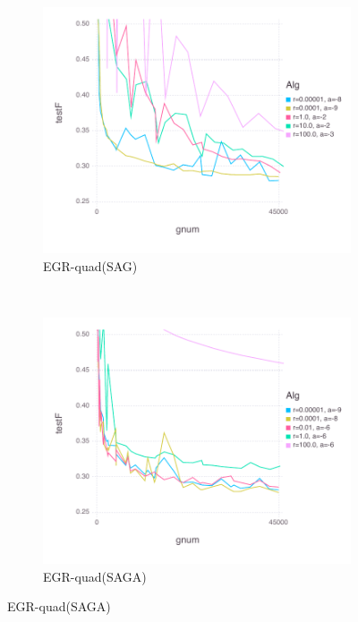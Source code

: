 \documentclass[11pt]{article}
\begin{document}
\begin{figure}[H]
	    \begin{subfigure}[b]{0.45\textwidth}
           \includegraphics[width=\textwidth]{Figures/MNISTBLtrueffFinal-quadfalse.pdf}
           \caption{EGR-quad(SAG)}
       \end{subfigure}
       ~ %
       \begin{subfigure}[b]{0.45\textwidth}
           \includegraphics[width=\textwidth]{Figures/MNISTBLtrueffFinal-quadtrue.pdf}
           \caption{EGR-quad(SAGA)}
       \end{subfigure}
	   

\end{figure}
\end{document}
